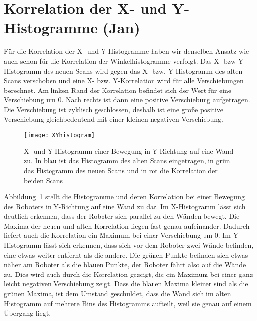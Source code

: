 \section{Korrelation der X- und Y-Histogramme (Jan)}

Für die Korrelation der X- und Y-Histogramme haben wir denselben Ansatz wie auch schon für die Korrelation der Winkelhistogramme verfolgt. Das X- bzw Y-Histogramm des neuen Scans wird gegen das X- bzw. Y-Histogramm des alten Scans verschoben und eine X- bzw. Y-Korrelation wird für alle Verschiebungen berechnet. Am linken Rand der Korrelation befindet sich der Wert für eine Verschiebung um 0. Nach rechts ist dann eine positive Verschiebung aufgetragen. Die Verschiebung ist zyklisch geschlossen, deshalb ist eine große positive Verschiebung gleichbedeutend mit einer kleinen negativen Verschiebung.

\begin{figure}
	\centering
	\texttt{[image: XYhistogram]}
	\caption{X- und Y-Histogramm einer Bewegung in Y-Richtung auf eine Wand zu. In blau ist das Histogramm des alten Scans eingetragen, in grün das Histogramm des neuen Scans und in rot die Korrelation der beiden Scans}
	\label{fig:xyhistogram}
\end{figure}

Abbildung~\ref{fig:xyhistogram} stellt die Histogramme und deren Korrelation bei einer Bewegung des Roboters in Y-Richtung auf eine Wand zu dar. Im X-Histogramm lässt sich deutlich erkennen, dass der Roboter sich parallel zu den Wänden bewegt. Die Maxima der neuen und alten Korrelation liegen fast genau aufeinander. Dadurch liefert auch die Korrelation ein Maximum bei einer Verschiebung um 0. Im Y-Histogramm lässt sich erkennen, dass sich vor dem Roboter zwei Wände befinden, eine etwas weiter entfernt als die andere. Die grünen Punkte befinden sich etwas näher am Roboter als die blauen Punkte, der Roboter fährt also auf die Wände zu. Dies wird auch durch die Korrelation gezeigt, die ein Maximum bei einer ganz leicht negativen Verschiebung zeigt. Dass die blauen Maxima kleiner sind als die grünen Maxima, ist dem Umstand geschuldet, dass die Wand sich im alten Histogramm auf mehrere Bins des Histogramms aufteilt, weil sie genau auf einem Übergang liegt.